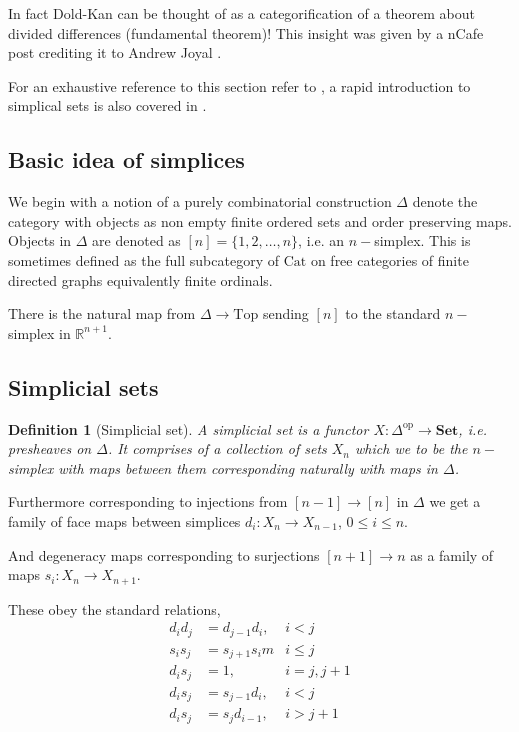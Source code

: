 \documentclass[12pt]{article}
\numberwithin{equation}{section}
\newcommand{\R}{\mathbb{R}}
\newtheorem{definition}{Definition}[section]
\begin{document}
	In fact Dold-Kan can be thought of as a categorification of a theorem about divided differences (fundamental theorem)! This insight was given by a nCafe post crediting it to Andrew Joyal \cite{ncafedk}.
	
	For an exhaustive reference to this section refer to \cite{Goerss_Jardine_2009}, a rapid introduction to simplical sets is also covered in \cite{Riehl2011ALI}.
	\subsection{Basic idea of simplices}
	We begin with a notion of a purely combinatorial construction $\Delta$ denote the category with objects as non empty finite ordered sets and order preserving maps. Objects in $\Delta$ are denoted as $[n]=\{1,2,\dots,n\}$, i.e. an $n-$simplex. This is sometimes defined as the full subcategory of $\mathrm{Cat}$ on free categories of finite directed graphs equivalently finite ordinals.
	
	There is the natural map from $\Delta \to \mathrm{Top}$ sending $[n]$ to the standard $n-$simplex in $\R^{n+1}$.
	
	\subsection{Simplicial sets}
	
	\begin{definition}[Simplicial set]
		A simplicial set is a functor $X: \Delta^\mathrm{op} \to \mathbf{Set}$, i.e. presheaves on $\Delta$. It comprises of a collection of sets $X_n$ which we to be the $n-$simplex with maps between them corresponding naturally with maps in $\Delta$.
	\end{definition}
	
	Furthermore corresponding to injections from $[n-1] \to [n]$ in $\Delta$ we get a family of face maps between simplices $d_i:X_n \to X_{n-1}$, $0\leq i \leq n$.
	
	And degeneracy maps corresponding to surjections $ [n+1] \to n$ as a family of maps $s_i: X_n \to X_{n+1}$.
	
	These obey the standard relations,
	\begin{align*}
		d_id_j &= d_{j-1}d_i, &i <j\\
		s_is_j&=s_{j+1}s_im &i \leq j\\
		d_is_j&=1, &i=j,j+1\\
		d_is_j&=s_{j-1}d_i,& i<j\\
		d_is_j&=s_jd_{i-1},& i>j+1
	\end{align*}
	
\end{document}
